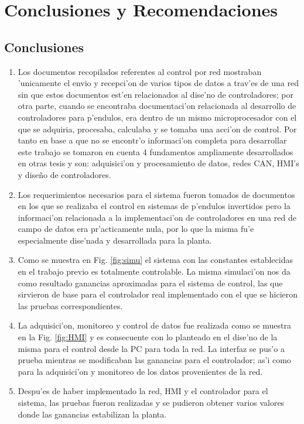 \chapter{Conclusiones y Recomendaciones}
\section{Conclusiones}
\begin{enumerate}
	\item Los documentos recopilados referentes al control por red mostraban 'unicamente el envio y recepci'on de varios tipos de datos a trav'es de una red sin que estos documentos est'en relacionados al dise'no de controladores; por otra parte, cuando se encontraba documentaci'on relacionada al desarrollo de controladores para p'endulos, era dentro de un mismo microprocesador con el que se adquiria, procesaba, calculaba y se tomaba una acci'on de control. Por tanto en base a que no se encontr'o informaci'on completa para desarrollar este trabajo se tomaron en cuenta 4 fundamentos ampliamente desarrollados en otras tesis y son: adquisici'on y procesamiento de datos, redes CAN, HMI's y diseño de controladores.
	\item Los requerimientos necesarios para el sistema fueron tomados de documentos en los que se realizaba el control en sistemas de p'endulos invertidos pero la informaci'on relacionada a la implementaci'on de controladores en una red de campo de datos era pr'acticamente nula, por lo que la misma fu'e especialmente dise'nada y desarrollada para la planta.
	
	\item Como se muestra en  Fig. \ref{fig:simu} el sistema con las constantes establecidas en el trabajo previo es totalmente controlable. La misma simulaci'on nos da como resultado ganancias aproximadas para el sistema de control, las que sirvieron de base para el controlador real implementado con el que se hicieron las pruebas correspondientes.
	\item La adquisici'on, monitoreo y control de datos fue realizada como se muestra en la Fig. \ref{fig:HMI} y es consecuente con lo planteado en el dise'no de la misma para el control desde la PC para toda la red. La interfaz se pus'o a prueba mientras se modificaban las ganancias para el controlador; as'i como para la adquisici'on y monitoreo de los datos provenientes de la red. 
	\item Despu'es de haber implementado la red, HMI y el controlador para el sistema, las pruebas fueron realizadas y se pudieron obtener varios valores donde las ganancias estabilizan la planta.
\end{enumerate}

